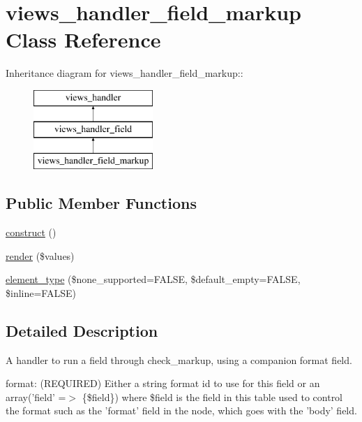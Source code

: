 \hypertarget{classviews__handler__field__markup}{
\section{views\_\-handler\_\-field\_\-markup Class Reference}
\label{classviews__handler__field__markup}
}
Inheritance diagram for views\_\-handler\_\-field\_\-markup::\begin{figure}[H]
\begin{center}
\leavevmode
\includegraphics[height=3cm]{classviews__handler__field__markup}
\end{center}
\end{figure}
\subsection*{Public Member Functions}
\begin{DoxyCompactItemize}
\item 
\hyperlink{classviews__handler__field__markup_addc5d6e6130133c1d65d8b96dce502a5}{construct} ()
\item 
\hyperlink{classviews__handler__field__markup_a7a6eb0c91f30643eb29d19dcc76b23d3}{render} (\$values)
\item 
\hyperlink{classviews__handler__field__markup_ac8cb32153441482ce1dc79341dfd86c2}{element\_\-type} (\$none\_\-supported=FALSE, \$default\_\-empty=FALSE, \$inline=FALSE)
\end{DoxyCompactItemize}


\subsection{Detailed Description}
A handler to run a field through check\_\-markup, using a companion format field.


\begin{DoxyItemize}
\item format: (REQUIRED) Either a string format id to use for this field or an array('field' =$>$ \{\$field\}) where \$field is the field in this table used to control the format such as the 'format' field in the node, which goes with the 'body' field. 
\end{DoxyItemize}


